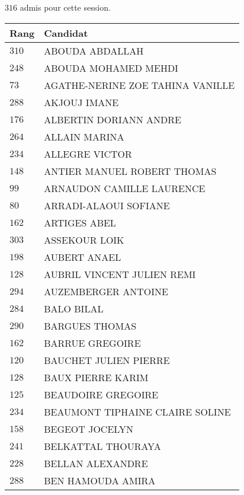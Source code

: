 



  $316$ admis pour cette session.

  \begin{xltabular}{\linewidth}{|l|X|}
    \hline
    \textbf{Rang} & \textbf{Candidat} \\
    \hline
    $310$ & ABOUDA ABDALLAH \\
    \hline
    $248$ & ABOUDA MOHAMED MEHDI \\
    \hline
    $73$ & AGATHE-NERINE ZOE TAHINA VANILLE \\
    \hline
    $288$ & AKJOUJ IMANE \\
    \hline
    $176$ & ALBERTIN DORIANN ANDRE \\
    \hline
    $264$ & ALLAIN MARINA \\
    \hline
    $234$ & ALLEGRE VICTOR \\
    \hline
    $148$ & ANTIER MANUEL ROBERT THOMAS \\
    \hline
    $99$ & ARNAUDON CAMILLE LAURENCE \\
    \hline
    $80$ & ARRADI-ALAOUI SOFIANE \\
    \hline
    $162$ & ARTIGES ABEL \\
    \hline
    $303$ & ASSEKOUR LOIK \\
    \hline
    $198$ & AUBERT ANAEL \\
    \hline
    $128$ & AUBRIL VINCENT JULIEN REMI \\
    \hline
    $294$ & AUZEMBERGER ANTOINE \\
    \hline
    $284$ & BALO BILAL \\
    \hline
    $290$ & BARGUES THOMAS \\
    \hline
    $162$ & BARRUE GREGOIRE \\
    \hline
    $120$ & BAUCHET JULIEN PIERRE \\
    \hline
    $128$ & BAUX PIERRE KARIM \\
    \hline
    $125$ & BEAUDOIRE GREGOIRE \\
    \hline
    $234$ & BEAUMONT TIPHAINE CLAIRE SOLINE \\
    \hline
    $158$ & BEGEOT JOCELYN \\
    \hline
    $241$ & BELKATTAL THOURAYA \\
    \hline
    $228$ & BELLAN ALEXANDRE \\
    \hline
    $288$ & BEN HAMOUDA AMIRA \\
    \hline

\end{xltabular}
